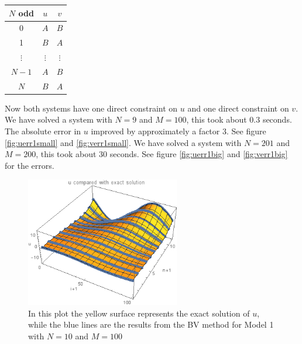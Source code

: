 \documentclass{article}
\renewcommand{\(}{\left(}
\renewcommand{\)}{\right)}
\begin{document}
\begin{center}
\begin{tabular}{c|cc}
$N$ odd & $u$ & $v$\\
\hline
0 & $A$ & $B$ \\
1 & $B$ & $A$ \\
$\vdots$ & $\vdots$ & $\vdots$ \\
$N-1$ & $A$ & $B$ \\
$N$ & $B$ & $A$ \\
\end{tabular}
\end{center}

Now both systems have one direct constraint on $u$ and one direct constraint on $v$. We have solved a system with $N = 9$ and $M = 100$, this took about $0.3$ seconds. The absolute error in $u$ improved by approximately a factor 3. See figure \ref{fig:uerr1small} and \ref{fig:verr1small}.
We have solved a system with $N = 201$ and $M = 200$, this took about $30$ seconds. See figure \ref{fig:uerr1big} and \ref{fig:verr1big} for the errors.

\begin{figure}
\centering
\includegraphics[width=0.6\textwidth]{uCompared.png}
\caption{In this plot the yellow surface represents the exact solution of $u$, while the blue lines are the results from the BV method for Model 1 with $N=10$ and $M=100$}
\label{fig:ucomp1}
\end{figure}

\clearpage
\end{document}
